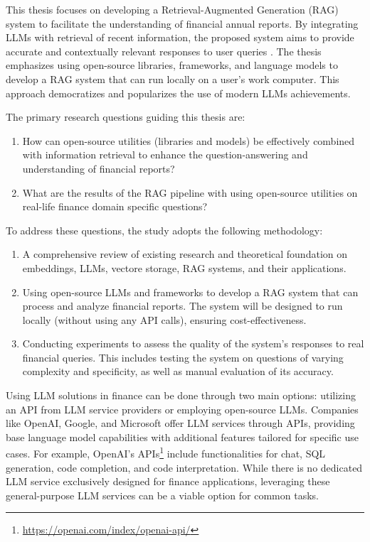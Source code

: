 This thesis focuses on developing a Retrieval-Augmented Generation (RAG) system to facilitate the understanding of financial annual reports. By integrating LLMs with retrieval of recent information, the proposed system aims to provide accurate and contextually relevant responses to user queries \cite{Gao.18Dec2023}. The thesis emphasizes using open-source libraries, frameworks, and language models to develop a RAG system that can run locally on a user's work computer. This approach democratizes and popularizes the use of modern LLMs achievements.

The primary research questions guiding this thesis are:
\begin{enumerate}
\item How can open-source utilities (libraries and models) be effectively combined with information retrieval to enhance the question-answering and understanding of financial reports?
\item What are the results of the RAG pipeline with using open-source utilities on real-life finance domain specific questions?
\end{enumerate}

To address these questions, the study adopts the following methodology:
\begin{enumerate}
\item A comprehensive review of existing research and theoretical foundation on embeddings, LLMs, vectore storage, RAG systems, and their applications. 
\item Using open-source LLMs and frameworks to develop a RAG system that can process and analyze financial reports. The system will be designed to run locally (without using any API calls), ensuring cost-effectiveness.
\item Conducting experiments to assess the quality of the system's responses to real  financial queries. This includes testing the system on questions of varying complexity and specificity, as well as manual evaluation of its accuracy.
\end{enumerate}

Using LLM solutions in finance can be done through two main options: utilizing an API from LLM service providers or employing open-source LLMs. Companies like OpenAI, Google, and Microsoft offer LLM services through APIs, providing base language model capabilities with additional features tailored for specific use cases. For example, OpenAI’s APIs\footnote{\url{https://openai.com/index/openai-api/}} include functionalities for chat, SQL generation, code completion, and code interpretation. While there is no dedicated LLM service exclusively designed for finance applications, leveraging these general-purpose LLM services can be a viable option for common tasks.

